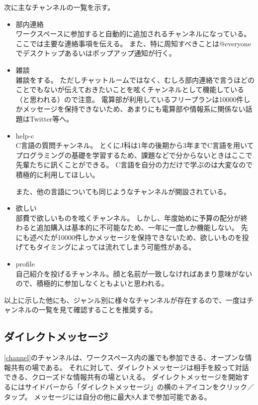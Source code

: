 \documentclass[lualatex,ja=standard,12pt,a4j]{bxjsbook}
\begin{document}
            	次に主なチャンネルの一覧を示す。
            
            	\begin{itemize}
            		\item 部内連絡\\
                        ワークスペースに参加すると自動的に追加されるチャンネルになっている。
                        ここでは主要な連絡事項を伝える。
                        また、特に周知すべきことは@everyoneでデスクトップあるいはポップアップ通知が行く。
                	\item 雑談\\
                    	雑談をする。
                        ただしチャットルームではなく、むしろ部内連絡で言うほどのことでもないが伝えておきたいことを呟くチャンネルとして機能している（と思われる）ので注意。
                        電算部が利用しているフリープランは10000件しかメッセージを保持できないため、あまりにも電算部や情報系に関係ない話題はTwitter等へ。
                    \item help-c\\
                    	C言語の質問チャンネル。
                        とくにJ科は1年の後期から3年までC言語を用いてプログラミングの基礎を学習するため、課題などで分からないときはここで先輩たちに訊くことができる。
                        C言語を自分の力だけで学ぶのは大変なので積極的に利用してほしい。
                        
                        また、他の言語についても同じようなチャンネルが開設されている。
                    \item 欲しい\\
                    	部費で欲しいものを呟くチャンネル。
                        しかし、年度始めに予算の配分が終わると追加購入は基本的に不可能なため、一年に一度しか機能しない。
                        先にも述べたが10000件しかメッセージを保持できないため、欲しいものを投げてもタイミングによっては流れてしまう可能性がある。
                    \item profile\\
                    	自己紹介を投げるチャンネル。顔と名前が一致しなければあまり意味がないので、積極的に参加しなくともよいと思われる。
            	\end{itemize}
            
            	以上に示した他にも、ジャンル別に様々なチャンネルが存在するので、一度はチャンネルの一覧を見て確認することを推奨する。
                
   			\subsection{ダイレクトメッセージ\label{directmessage}}
            	\ref{channel}のチャンネルは、ワークスペース内の誰でも参加できる、オープンな情報共有の場である。
                それに対して、ダイレクトメッセージは相手を絞って対話できる、クローズドな情報共有の場といえる。
                ダイレクトメッセージを開始するにはサイドバーから「ダイレクトメッセージ」の横の＋アイコンをクリック／タップ。
                メッセージには自分の他に最大8人まで参加可能である。
            
\end{document}
